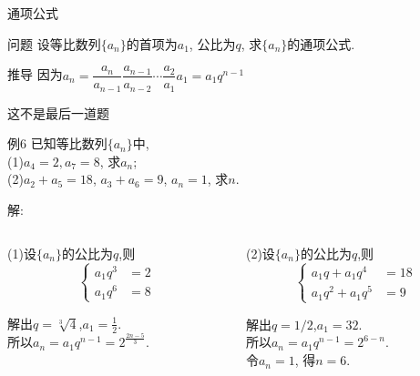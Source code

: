 \documentclass[mathserif,blue]{beamer}
\newlength\lengtha\newcommand\an[1][a]{\ensuremath{\{#1_n\}}}\newcommand\lines[1][1.2]{\,\underline{\mbox{\hspace{#1cm}}}\,}%
\newcommand\beamercolorlinebox[1]{\settowidth\lengtha{#1}\centerline{\begin{beamercolorbox}[rounded=true,shadow=true,wd=\lengtha]{mycolor}#1\end{beamercolorbox}}}
\begin{document}
\begin{frame}{通项公式}
\begin{exampleblock}{问题}
  设等比数列\an 的首项为$a_1$, 公比为$q$, 求\an 的通项公式.
  \end{exampleblock}
    \pause
  \begin{block}{推导}
  因为$a_n=\dfrac{a_n}{a_{n-1}}\dfrac{a_{n-1}}{a_{n-2}}\cdots\dfrac{a_2}{a_1}a_1=a_1q^{n-1}$\par
  \end{block}
    \pause
\end{frame}


\begin{frame}{这不是最后一道题}
  \begin{exampleblock}{例6}
    已知等比数列\an 中, \\
    (1)$a_4=2,a_7=8$, 求$a_n$;\\
    (2)$a_2+a_5=18$, $a_3+a_6=9$, $a_n=1$, 求$n$.
  \end{exampleblock}\pause
  \begin{block}{解:}\pause
  \begin{columns}
    \begin{column}{0.45\textwidth}
      (1)设\an 的公比为$q$,则\vspace*{-2ex}
    \begin{equation*}
      \begin{cases}
        a_1q^3&=2\\
        a_1q^6&=8
      \end{cases}
    \end{equation*}\vspace*{-2ex} \par\pause
        解出$q=\sqrt[3]{4}$,$a_1=\frac12$.\\\pause
        所以$a_n=a_1q^{n-1}=2^{\tfrac{2n-5}{3}}$.\\\pause
    \end{column}
    \begin{column}{0.45\textwidth}
        (2)设\an 的公比为$q$,则\vspace*{-2ex}
      \begin{equation*}
        \begin{cases}
          a_1q+a_1q^4&=18\\
          a_1q^2+a_1q^5&=9
        \end{cases}
      \end{equation*}\vspace*{-2ex} \par\pause
        解出$q=1/2$,$a_1=32$.\\\pause
        所以$a_n=a_1q^{n-1}=2^{6-n}$.\\\pause
        令$a_n=1$, 得$n=6$.
    \end{column}
  \end{columns}
  \end{block}
\end{frame}
\end{document}

